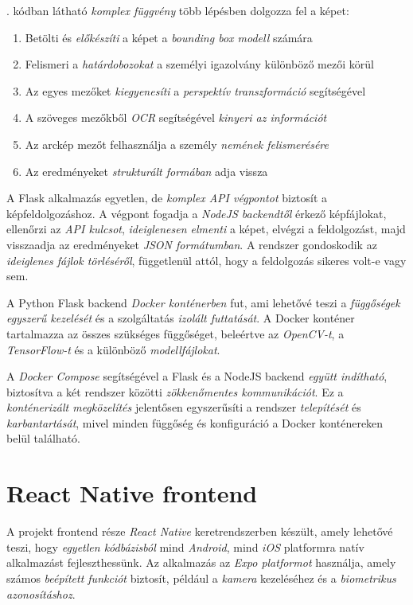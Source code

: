 \documentclass[
]{thesis-ekf}
\theoremstyle{definition}
\theoremstyle{remark}
\begin{document}
. kódban látható \emph{komplex függvény} több lépésben dolgozza fel a képet: \begin{enumerate} \item Betölti és \emph{előkészíti} a képet a \emph{bounding box modell} számára \item Felismeri a \emph{határdobozokat} a személyi igazolvány különböző mezői körül \item Az egyes mezőket \emph{kiegyenesíti} a \emph{perspektív transzformáció} segítségével \item A szöveges mezőkből \emph{OCR} segítségével \emph{kinyeri az információt} \item Az arckép mezőt felhasználja a személy \emph{nemének felismerésére} \item Az eredményeket \emph{strukturált formában} adja vissza \end{enumerate}

A Flask alkalmazás egyetlen, de \emph{komplex API végpontot} biztosít a képfeldolgozáshoz. A végpont fogadja a \emph{NodeJS backendtől} érkező képfájlokat, ellenőrzi az \emph{API kulcsot}, \emph{ideiglenesen elmenti} a képet, elvégzi a feldolgozást, majd visszaadja az eredményeket \emph{JSON formátumban}. A rendszer gondoskodik az \emph{ideiglenes fájlok törléséről}, függetlenül attól, hogy a feldolgozás sikeres volt-e vagy sem.

A Python Flask backend \emph{Docker konténerben} fut, ami lehetővé teszi a \emph{függőségek egyszerű kezelését} és a szolgáltatás \emph{izolált futtatását}. A Docker konténer tartalmazza az összes szükséges függőséget, beleértve az \emph{OpenCV-t}, a \emph{TensorFlow-t} és a különböző \emph{modellfájlokat}.

A \emph{Docker Compose} segítségével a Flask és a NodeJS backend \emph{együtt indítható}, biztosítva a két rendszer közötti \emph{zökkenőmentes kommunikációt}. Ez a \emph{konténerizált megközelítés} jelentősen egyszerűsíti a rendszer \emph{telepítését} és \emph{karbantartását}, mivel minden függőség és konfiguráció a Docker konténereken belül található.

\section{React Native frontend}

A projekt frontend része \emph{React Native} keretrendszerben készült, amely lehetővé teszi, hogy \emph{egyetlen kódbázisból} mind \emph{Android}, mind \emph{iOS} platformra natív alkalmazást fejleszthessünk. Az alkalmazás az \emph{Expo platformot} használja, amely számos \emph{beépített funkciót} biztosít, például a \emph{kamera} kezeléséhez és a \emph{biometrikus azonosításhoz}.
\end{document}
